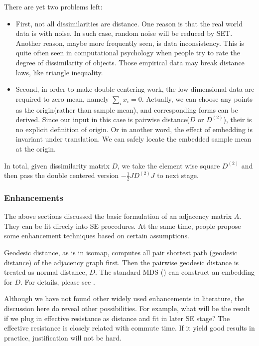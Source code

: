 There are yet two problems left:
\begin{itemize}
	\item First, not all dissimilarities are distance. One reason is 
		that the real world data is with noise. In such case, 
		random noise will be reduced by SET. Another reason, 
		maybe more frequently seen, is data inconsistency. 
		This is quite often seen in computational psychology 
		when people try to rate the degree of dissimilarity of 
		objects\cite{borg2005modern}. Those empirical data 
		may break distance laws, like triangle inequality. 
	\item Second, in order to make double centering work, 
		the low dimensional data are required to zero mean, 
		namely $\sum_i{x_i} = 0$. Actually, we can choose any 
		points as the origin(rather than sample mean), and 
		corresponding forms can be derived. Since our input in this case 
		is pairwise distance($D$ or $D^{(2)}$), their is no 
		explicit definition of origin. Or in another word, 
		the effect of embedding is invariant under translation. 
		We can safely locate the embedded sample mean at the origin. 
\end{itemize}

In total, given dissimilarity matrix $D$, we 
take the element wise square $D^{(2)}$ and then 
pass the double centered version $-\frac{1}{2}JD^{(2)}J$
to next stage. 

\subsubsection{Enhancements}
\label{sec:enhance}

The above sections discussed the basic formulation of an 
adjacency matrix $A$. They can be fit direcly into SE
procedures. At the same time, people propose some 
enhancement techniques based on certain assumptions. 

Geodesic distance, as is in isomap\cite{tenenbaum2000isomap}, 
computes all pair shortest path (geodesic distance) 
of the adjacency graph first. Then the pairwise geodesic distance 
is treated as normal distance, $D$. The standard MDS
(\rsec{\ref{sec:mds}}) can 
construct an embedding for $D$. For details, please see 
\rsec{\ref{sec:isomap}}. 

Although we have not found other widely used enhancements
in literature, the discussion here do reveal other possibilities. 
For example, what will be the result if we plug in effective 
resistance as distance and fit in later SE stage? The effective 
resistance is closely related with commute time\cite{lau-2012-spectral-ln}. 
If it yield good results in practice, justification will not 
be hard. 

